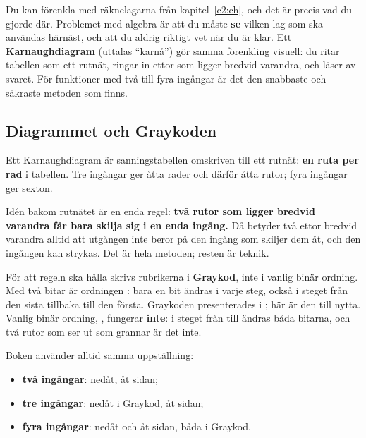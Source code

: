 Du kan förenkla med räknelagarna från kapitel~\ref{c2:ch}, och det är precis vad du gjorde där.
Problemet med algebra är att du måste \textbf{se} vilken lag som ska användas härnäst, och att du
aldrig riktigt vet när du är klar. Ett \textbf{Karnaughdiagram} (uttalas \enquote{karnå}) gör samma
förenkling visuell: du ritar tabellen som ett rutnät, ringar in ettor som ligger bredvid varandra,
och läser av svaret. För funktioner med två till fyra ingångar är det den snabbaste och säkraste
metoden som finns.

\subsection{Diagrammet och Graykoden}
\label{c4:a2}
Ett Karnaughdiagram är sanningstabellen omskriven till ett rutnät: \textbf{en ruta per rad} i
tabellen. Tre ingångar ger åtta rader och därför åtta rutor; fyra ingångar ger sexton.

Idén bakom rutnätet är en enda regel: \textbf{två rutor som ligger bredvid varandra får bara skilja
sig i en enda ingång.} Då betyder två ettor bredvid varandra alltid att utgången inte beror på den
ingång som skiljer dem åt, och den ingången kan strykas. Det är hela metoden; resten är teknik.

För att regeln ska hålla skrivs rubrikerna i \textbf{Graykod}, inte i vanlig binär ordning. Med två
bitar är ordningen : bara en bit ändras i varje steg, också i steget från den
sista tillbaka till den första. Graykoden presenterades i ; här är den till nytta.
Vanlig binär ordning, , fungerar \textbf{inte}: i steget från  till
 ändras båda bitarna, och två rutor som ser ut som grannar är det inte.

Boken använder alltid samma uppställning:
\begin{itemize}
  \item \textbf{två ingångar}:  nedåt,  åt sidan;
  \item \textbf{tre ingångar}:  nedåt i Graykod,  åt sidan;
  \item \textbf{fyra ingångar}:  nedåt och  åt sidan, båda i Graykod.
\end{itemize}



